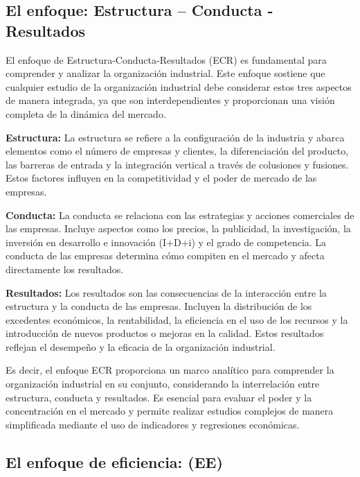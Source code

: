 \documentclass[
  a4paper,
]{article}
\begin{document}
\hypertarget{el-enfoque-estructura-conducta---resultados}{%
\subsection{El enfoque: Estructura -- Conducta -
Resultados}\label{el-enfoque-estructura-conducta---resultados}}

El enfoque de Estructura-Conducta-Resultados (ECR) es fundamental para
comprender y analizar la organización industrial. Este enfoque sostiene
que cualquier estudio de la organización industrial debe considerar
estos tres aspectos de manera integrada, ya que son interdependientes y
proporcionan una visión completa de la dinámica del mercado.

\textbf{Estructura:} La estructura se refiere a la configuración de la
industria y abarca elementos como el número de empresas y clientes, la
diferenciación del producto, las barreras de entrada y la integración
vertical a través de colusiones y fusiones. Estos factores influyen en
la competitividad y el poder de mercado de las empresas.

\textbf{Conducta:} La conducta se relaciona con las estrategias y
acciones comerciales de las empresas. Incluye aspectos como los precios,
la publicidad, la investigación, la inversión en desarrollo e innovación
(I+D+i) y el grado de competencia. La conducta de las empresas determina
cómo compiten en el mercado y afecta directamente los resultados.

\textbf{Resultados:} Los resultados son las consecuencias de la
interacción entre la estructura y la conducta de las empresas. Incluyen
la distribución de los excedentes económicos, la rentabilidad, la
eficiencia en el uso de los recursos y la introducción de nuevos
productos o mejoras en la calidad. Estos resultados reflejan el
desempeño y la eficacia de la organización industrial.

Es decir, el enfoque ECR proporciona un marco analítico para comprender
la organización industrial en su conjunto, considerando la interrelación
entre estructura, conducta y resultados. Es esencial para evaluar el
poder y la concentración en el mercado y permite realizar estudios
complejos de manera simplificada mediante el uso de indicadores y
regresiones económicas.

\hypertarget{el-enfoque-de-eficiencia-ee}{%
\subsection{El enfoque de eficiencia:
(EE)}\label{el-enfoque-de-eficiencia-ee}}
\end{document}
